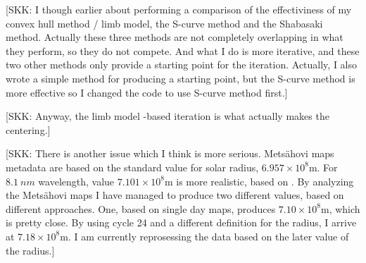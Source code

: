 \documentclass{aa}
\newcommand{\skk}[1]{\textcolor{midorange}{[SKK: #1]}} %
\begin{document}
    \skk{I though earlier about performing a comparison of the effectiviness of my convex hull method / limb model, the 
    S-curve method and the Shabasaki method. Actually these three methods are not completely overlapping in what they 
    perform, so they do not compete. And what I do is more iterative, and these two other methods only provide a 
    starting point for the iteration. Actually, I also wrote a simple method for producing a starting point, but the 
    S-curve method is more effective so I changed the code to use S-curve method first.}

    \skk{Anyway, the limb model -based iteration is what actually makes the centering.}
    
    \skk{There is another issue which I think is more serious. Metsähovi maps metadata are based on the standard value 
    for solar radius, $6.957 \times 10^8 \mathrm{m}$. For $\SI{8.1}{nm}$ wavelength, value $7.101 \times 10^8 
    \mathrm{m}$ is more realistic, based on \cite{Rozelot15}. By analyzing the Metsähovi maps I have managed to produce 
    two different values, based on different approaches. One, based on single day maps, produces $7.10 \times 10^8 
    \mathrm{m}$, which is pretty close. By using cycle 24 and a different definition for the radius, I arrive at $7.18 
    \times 10^8 \mathrm{m}$. I am currently reprosessing the data based on the later value of the radius.}
    
\end{document}
